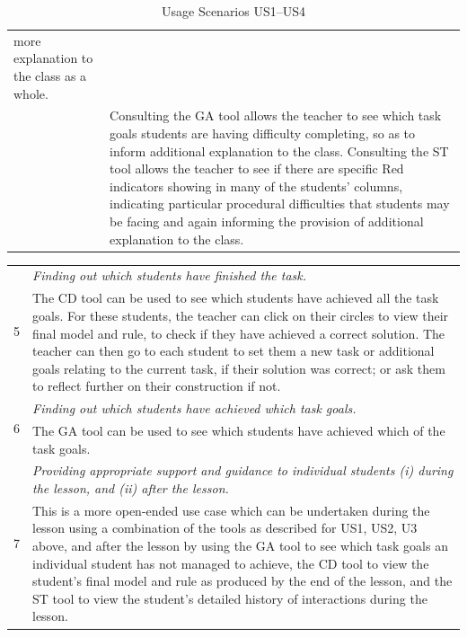 \begin{table}[htbp]
\begin{tabular}{|p{0.5cm}|p{12.5cm}|}
{    more explanation to the
    class as a whole.} \\
  \cline{2-2} 
  & Consulting the GA tool allows the teacher to see which
  task goals students are having difficulty completing, so as to
  inform additional explanation to the class.  Consulting the ST tool
  allows the teacher to see if there are specific Red indicators
  showing in many of the students' columns, indicating particular
  procedural difficulties that students may be facing and again
  informing the provision of additional explanation to the class.\\
  \hline
  \end{tabular}
  \caption{Usage Scenarios US1--US4}
  \label{tab:djdjsdjk11}
\end{table}
 
\begin{table}[htbp]
  \begin{tabular}{|p{0.5cm}|p{12.5cm}|}
  \hline \multirow{2}{*}{5}
  & \emph{Finding out which students have finished the task.} \\
  \cline{2-2}
  & The CD tool can be used to see which students have achieved all
  the task goals. For these students, the teacher can click on their
  circles to view their final model and rule, to check if they have
  achieved a correct solution. The teacher can then go to each student
  to set them a new task or additional goals relating to the current
  task, if their solution was correct; or ask them to reflect further
  on their construction if not. \\
  \hline \multirow{2}{*}{6}
  & \emph{Finding out which students have achieved which task goals.} \\
  \cline{2-2}
  & The GA tool can be used to see which students have achieved which
  of the task goals. \\
  \hline \multirow{2}{*}{7}
  & \emph{Providing appropriate support and guidance to individual
  students (i) during the lesson, and (ii) after the lesson.} \\
  \cline{2-2}
  &  This is a more open-ended use case which can be undertaken during
  the lesson using a combination of the tools as described for US1,
  US2, U3 above, and after the lesson by using the GA tool to see
  which task goals an individual student has not managed to achieve,
  the CD tool to view the student's final model and rule as produced
  by the end of the lesson, and the ST tool to view the student's
  detailed history of interactions
  during the lesson.  \\

\end{tabular}
\end{table}
